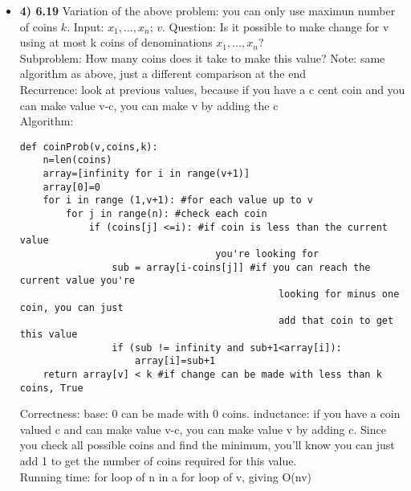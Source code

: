\documentclass[11pt]{article}
\begin{document}
\begin{itemize}
\begin{itemize}
\item \textbf{4) 6.19}
Variation of the above problem: you can only use maximun number of coins $k$. Input: $x_1, . . . , x_n$; $v$. Question: Is it possible to make change for v using at most k coins of denominations $x_1, . . . , x_n$?
\\Subproblem: How many coins does it take to make this value? Note: same algorithm as above, just a different comparison at the end
\\Recurrence: look at previous values, because if you have a c cent coin and you can make value v-c, you can make v by adding the c
\\Algorithm:
\begin{verbatim}
def coinProb(v,coins,k):
    n=len(coins)
    array=[infinity for i in range(v+1)]
    array[0]=0
    for i in range (1,v+1): #for each value up to v
        for j in range(n): #check each coin
            if (coins[j] <=i): #if coin is less than the current value 
                                  you're looking for
                sub = array[i-coins[j]] #if you can reach the current value you're 
                                             looking for minus one coin, you can just 
                                             add that coin to get this value
                if (sub != infinity and sub+1<array[i]):
                    array[i]=sub+1
    return array[v] < k #if change can be made with less than k coins, True
\end{verbatim}
Correctness: base: 0 can be made with 0 coins. inductance: if you have a coin valued c and can make value v-c, you can make value v by adding c. Since you check all possible coins and find the minimum, you'll know you can just add 1 to get the number of coins required for this value.
\\Running time: for loop of n in a for loop of v, giving O(nv)

\end{itemize}

\vspace{0.1in}


\end{itemize}
\end{document}
